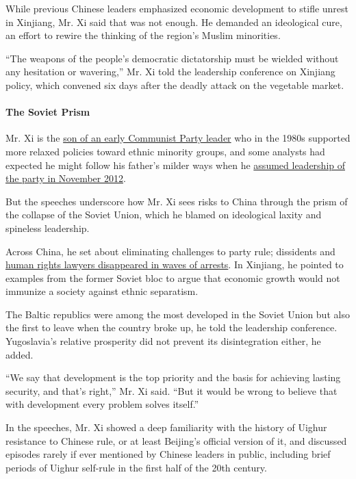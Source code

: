 While previous Chinese leaders emphasized economic development to stifle
unrest in Xinjiang, Mr. Xi said that was not enough. He demanded an
ideological cure, an effort to rewire the thinking of the region's
Muslim minorities.

``The weapons of the people's democratic dictatorship must be wielded
without any hesitation or wavering,'' Mr. Xi told the leadership
conference on Xinjiang policy, which convened six days after the deadly
attack on the vegetable market.

\hypertarget{-the-soviet-prism-}{%
\paragraph{ The Soviet Prism }\label{-the-soviet-prism-}}

Mr. Xi is the
\href{https://sinosphere.blogs.nytimes3xbfgragh.onion/2013/10/15/china-venerates-a-revolutionary-the-father-of-its-new-leader/}{son
of an early Communist Party leader} who in the 1980s supported more
relaxed policies toward ethnic minority groups, and some analysts had
expected he might follow his father's milder ways when he
\href{https://www.nytimes3xbfgragh.onion/2012/11/15/world/asia/communists-conclude-party-congress-in-china.html}{assumed
leadership of the party in November 2012}.

But the speeches underscore how Mr. Xi sees risks to China through the
prism of the collapse of the Soviet Union, which he blamed on
ideological laxity and spineless leadership.

Across China, he set about eliminating challenges to party rule;
dissidents and
\href{https://www.nytimes3xbfgragh.onion/2019/01/28/world/asia/china-wang-quanzhang-human-rights.html}{human
rights lawyers disappeared in waves of arrests}. In Xinjiang, he pointed
to examples from the former Soviet bloc to argue that economic growth
would not immunize a society against ethnic separatism.

The Baltic republics were among the most developed in the Soviet Union
but also the first to leave when the country broke up, he told the
leadership conference. Yugoslavia's relative prosperity did not prevent
its disintegration either, he added.

``We say that development is the top priority and the basis for
achieving lasting security, and that's right,'' Mr. Xi said. ``But it
would be wrong to believe that with development every problem solves
itself.''

In the speeches, Mr. Xi showed a deep familiarity with the history of
Uighur resistance to Chinese rule, or at least Beijing's official
version of it, and discussed episodes rarely if ever mentioned by
Chinese leaders in public, including brief periods of Uighur self-rule
in the first half of the 20th century.

